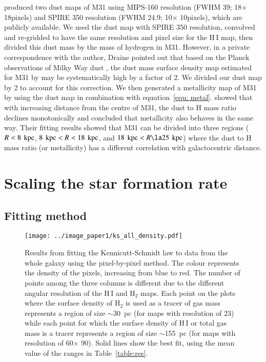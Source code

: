 \citet{Draine14} produced two dust maps of M31 using MIPS-160 resolution (FWHM  39\arcsec; 18\arcsec $\times$ 18\arcsec pixels) and SPIRE 350 resolution (FWHM 24\arcsec.9; 10\arcsec $\times$ 10\arcsec pixels), which are publicly available. 
We used the dust map with SPIRE 350 resolution, convolved and re-gridded  to have the same resolution and pixel size for the H\,{\sc I} map, then divided this dust mass by the mass of hydrogen in M31. 
However, in a private correspondence with the author, Draine pointed out that based on the Planck observations of Milky Way dust \citet{Tauber10}, the dust mass surface density map estimated for M31 by \citet{Draine14} may be systematically high by a factor of 2. We divided our dust map by 2 to account for this correction. 
We then generated a metallicity map of M31 by using the dust map in combination with equation~\ref{equ: metal}. \citet{Draine14} showed that with increasing distance from the centre of M31, the dust to H mass ratio declines monotonically and concluded that metallicity also behaves in the same way. 
Their fitting results showed that M31 can be divided into three regions ($R< 8~\,{\rm kpc}$, $8~\,{\rm kpc} < R < 18~\,{\rm kpc}$, and $18~\kpc < R \la 25~\kpc$) where the dust to H mass ratio (or metallicity) has a different correlation with galactocentric distance.
  
\section{Scaling the star formation rate}
\subsection{Fitting method}
\label{sec:fitting}

\begin{figure*}
\centering
\texttt{[image: ../image\_paper1/ks\_all\_density.pdf]}
\caption{Results from fitting the Kennicutt-Schmidt law to data from the whole galaxy using the pixel-by-pixel method. The colour represents the density of the pixels, increasing from blue to red. The number of points among the three columns is different due to the different angular resolution of the H\,{\sc I} and H$_2$ maps. Each point on the plots where the surface density of H$_2$ is used as a tracer of gas mass represents a region of size $\sim$30~pc (for maps with resolution of 23\arcsec) while each point for which the surface density of H\,{\sc I} or total gas mass is a tracer represents a region of size $\sim$155~pc (for maps with resolution of 60\arcsec $\times$ 90\arcsec). Solid lines show the best fit, using the mean value of the ranges in Table~\ref{table:res}.}
\label{fig:ks_all}
\end{figure*}

